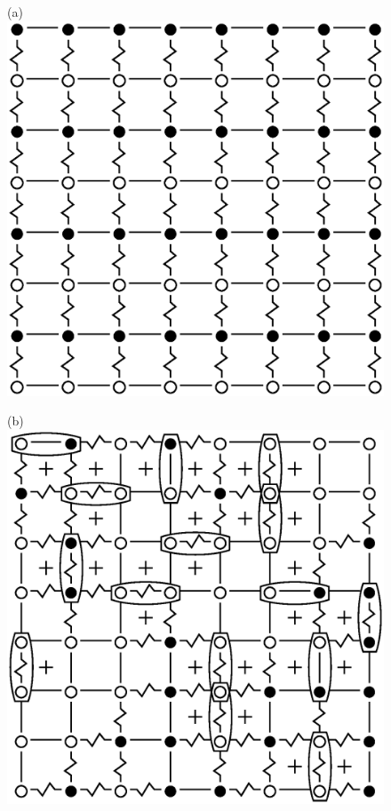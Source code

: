 \documentclass[preprint,12pt]{elsarticle}
\begin{document}
\begin{figure}[H]
	\begin{minipage}[h]{0.3\linewidth}
		\centering(a)
		\includegraphics[width=1\linewidth]{pictures/SI_64_J0_1}
	\end{minipage}
	\hfill
	\begin{minipage}[h]{0.3\linewidth}
	\centering(b)
	\includegraphics[width=1\linewidth]{pictures/SG_64_J0}

\end{minipage}
\end{figure}
\end{document}
